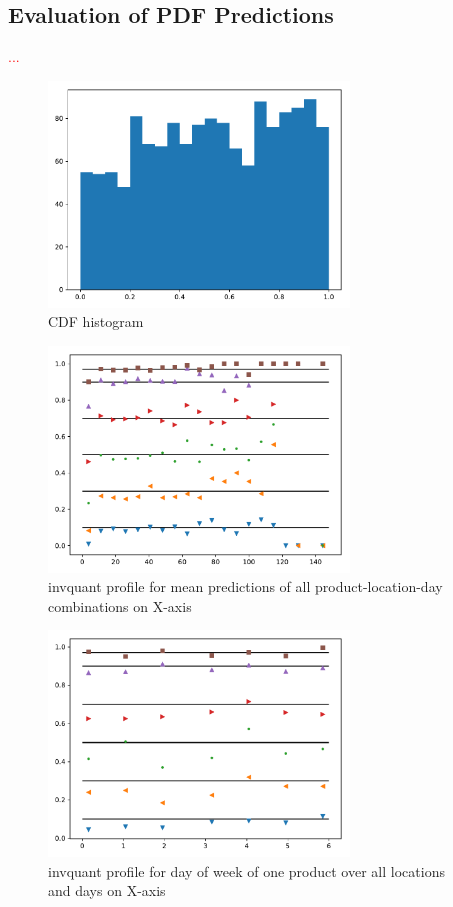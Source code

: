 \documentclass[BCOR=1mm, DIV=calc,10pt,
twoside=true,
twocolumn,
headings=normal]{scrartcl}
\begin{document}
\subsection{Evaluation of PDF Predictions}

\textcolor{red}{...}

\begin{figure}
\begin{center}
\includegraphics[width=8cm]{../figures/cdf_truth}
\caption{\label{fig:cdf_demand} CDF histogram}
\end{center}
\end{figure}

\begin{figure}
\begin{center}
\includegraphics[width=8cm]{../figures/invquant_yhat_mean}
\caption{\label{fig:invquant_mean} invquant profile for mean predictions of all product-location-day combinations on X-axis}
\end{center}
\end{figure}

\begin{figure}
\begin{center}
\includegraphics[width=8cm]{../figures/invquant_dayofweek}
\caption{\label{fig:invquant_dayofweek} invquant profile for day of week of one product over all locations and days on X-axis}
\end{center}
\end{figure}
\end{document}

